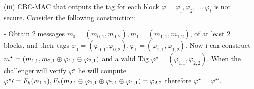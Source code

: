 \documentclass[11pt]{article}
\newcounter{t0d0_counter}
\begin{document}
(iii) 
CBC-MAC that outputs the tag for each block $\varphi=\varphi_1,\varphi_2,...,\varphi_t$ is not secure. Consider the following construction:

- Obtain 2 messages $m_0=(m_{0,1},m_{0,2}), m_1=(m_{1,1},m_{1,2})$, of at least 2 blocks, and their tags 
$\varphi_0=(\varphi_{0,1},\varphi_{0,2}), \varphi_1=(\varphi_{1,1},\varphi_{1,2})$. Now i can construct 
$m^\star=(m_{1,1}, m_{2,1}\oplus\varphi_{1,1}\oplus\varphi_{2,1})$ and a valid Tag 
$\varphi^\star=(\varphi_{1,1}, \varphi_{2,2})$. When the challenger will verify $\varphi^\star$ he will compute
$\varphi^\star\prime=F_k(m_{1,1}),F_k(m_{2,1}\oplus\varphi_{1,1}\oplus\varphi_{2,1}\oplus\varphi_{1,1})=\varphi_{2,2}$
therefore $\varphi^\star=\varphi^\star\prime$.
\end{document}
